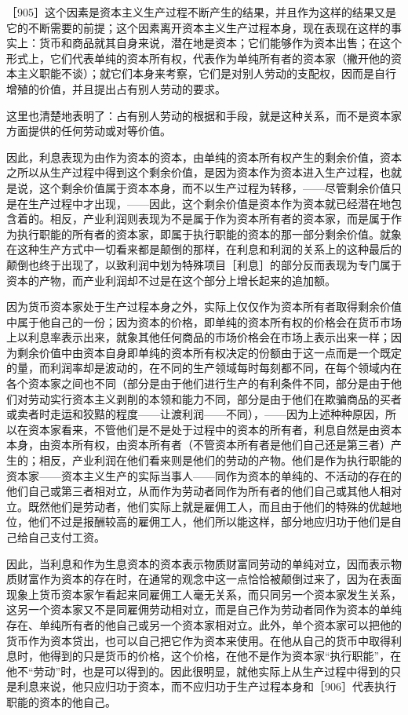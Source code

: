 ［905］这个因素是资本主义生产过程不断产生的结果，并且作为这样的结果又是它的不断需要的前提；这个因素离开资本主义生产过程本身，现在表现在这样的事实上：货币和商品就其自身来说，潜在地是资本；它们能够作为资本出售；在这个形式上，它们代表单纯的资本所有权，代表作为单纯所有者的资本家（撇开他的资本主义职能不谈）；就它们本身来考察，它们是对别人劳动的支配权，因而是自行增殖的价值，并且提出占有别人劳动的要求。

这里也清楚地表明了：占有别人劳动的根据和手段，就是这种关系，而不是资本家方面提供的任何劳动或对等价值。

因此，利息表现为由作为资本的资本，由单纯的资本所有权产生的剩余价值，资本之所以从生产过程中得到这个剩余价值，是因为资本作为资本进入生产过程，也就是说，这个剩余价值属于资本本身，而不以生产过程为转移，——尽管剩余价值只是在生产过程中才出现，——因此，这个剩余价值是资本作为资本就已经潜在地包含着的。相反，产业利润则表现为不是属于作为资本所有者的资本家，而是属于作为执行职能的所有者的资本家，即属于执行职能的资本的那一部分剩余价值。就象在这种生产方式中一切看来都是颠倒的那样，在利息和利润的关系上的这种最后的颠倒也终于出现了，以致利润中划为特殊项目［利息］的部分反而表现为专门属于资本的产物，而产业利润却不过是在这个部分上增长起来的追加额。

因为货币资本家处于生产过程本身之外，实际上仅仅作为资本所有者取得剩余价值中属于他自己的一份；因为资本的价格，即单纯的资本所有权的价格会在货币市场上以利息率表示出来，就象其他任何商品的市场价格会在市场上表示出来一样；因为剩余价值中由资本自身即单纯的资本所有权决定的份额由于这一点而是一个既定的量，而利润率却是波动的，在不同的生产领域每时每刻都不同，在每个领域内在各个资本家之间也不同（部分是由于他们进行生产的有利条件不同，部分是由于他们对劳动实行资本主义剥削的本领和能力不同，部分是由于他们在欺骗商品的买者或卖者时走运和狡黠的程度——让渡利润——不同），——因为上述种种原因，所以在资本家看来，不管他们是不是处于过程中的资本的所有者，利息自然是由资本本身，由资本所有权，由资本所有者（不管资本所有者是他们自己还是第三者）产生的；相反，产业利润在他们看来则是他们的劳动的产物。他们是作为执行职能的资本家——资本主义生产的实际当事人——同作为资本的单纯的、不活动的存在的他们自己或第三者相对立，从而作为劳动者同作为所有者的他们自己或其他人相对立。既然他们是劳动者，他们实际上就是雇佣工人，而且由于他们的特殊的优越地位，他们不过是报酬较高的雇佣工人，他们所以能这样，部分地应归功于他们是自己给自己支付工资。

因此，当利息和作为生息资本的资本表示物质财富同劳动的单纯对立，因而表示物质财富作为资本的存在时，在通常的观念中这一点恰恰被颠倒过来了，因为在表面现象上货币资本家乍看起来同雇佣工人毫无关系，而只同另一个资本家发生关系，这另一个资本家又不是同雇佣劳动相对立，而是自己作为劳动者同作为资本的单纯存在、单纯所有者的他自己或另一个资本家相对立。此外，单个资本家可以把他的货币作为资本贷出，也可以自己把它作为资本来使用。在他从自己的货币中取得利息时，他得到的只是货币的价格，这个价格，在他不是作为资本家“执行职能”，在他不“劳动”时，也是可以得到的。因此很明显，就他实际上从生产过程中得到的只是利息来说，他只应归功于资本，而不应归功于生产过程本身和［906］代表执行职能的资本的他自己。

